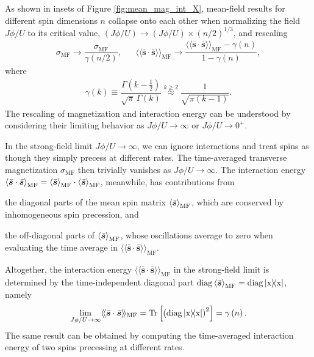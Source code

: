 \documentclass[nofootinbib,twocolumn]{revtex4-2}
\newcommand{\f}[2]{\dfrac{#1}{#2}} %
\newcommand{\p}[1]{\left(#1\right)} %
\renewcommand{\sp}[1]{\left[#1\right]} %
\newcommand{\bk}{\Braket} %
\renewcommand{\v}{\bm} %
\renewcommand{\c}{\cdot} %
\newcommand{\bbk}[1]{\langle\!\langle #1 \rangle\!\rangle}
\newcommand{\1}{\mathds{1}}
\newcommand{\x}{\text{x}}
\newcommand{\MF}{\text{MF}}
\renewcommand{\ss}{\bar{\v s}\c\bar{\v s}}
\DeclareMathOperator{\diag}{diag}
\begin{document}
As shown in insets of Figure \ref{fig:mean_mag_int_X}, mean-field results for different spin dimensions $n$ collapse onto each other when normalizing the field $J\phi/U$ to its critical value, $\p{J\phi/U}\to\p{J\phi/U}\times\p{n/2}^{1/3}$, and rescaling
\begin{align}
  \sigma_\MF \to \f{\sigma_\MF}{\gamma\p{n/2}},
  &&
  \bbk{\ss}_\MF \to \f{\bbk{\ss}_\MF-\gamma\p{n}}{1-\gamma\p{n}},
  \label{eq:rescale}
\end{align}
where
\begin{align}
  \gamma\p{k} \equiv \f{\Gamma\p{k-\frac12}}{\sqrt\pi\,\Gamma\p{k}}
  \stackrel{k\ge2}{\approx} \f1{\sqrt{\pi(k-1)}}.
  \label{eq:gamma}
\end{align}
The rescaling of magnetization and interaction energy can be understood by considering their limiting behavior as $J\phi/U\to\infty$ or $J\phi/U\to0^+$.

In the strong-field limit $J\phi/U\to\infty$, we can ignore interactions and treat spins as though they simply precess at different rates.
The time-averaged transverse magnetization $\sigma_\MF$ then trivially vanishes as $J\phi/U\to\infty$.
The interaction energy $\bk{\ss}_\MF = \bk{\bar{\v s}}_\MF \c \bk{\bar{\v s}}_\MF$, meanwhile, has contributions from
\begin{enumerate*}
\item the diagonal parts of the mean spin matrix $\bk{\bar{\v s}}_\MF$, which are conserved by inhomogeneous spin precession, and
\item the off-diagonal parts of $\bk{\bar{\v s}}_\MF$, whose oscillations average to zero when evaluating the time average in $\bbk{\ss}_\MF$.
\end{enumerate*}
Altogether, the interaction energy $\bbk{\ss}_\MF$ in the strong-field limit is determined by the time-independent diagonal part $\diag\bk{\bar{\v s}}_\MF = \diag\op{\x}$, namely
\begin{align}
  \lim_{J\phi/U\to\infty} \bbk{\ss}_\MF
  = \Tr\sp{\p{\diag\op{\x}}^2}
  = \gamma\p{n}.
  \label{eq:lim_ss}
\end{align}
The same result can be obtained by computing the time-averaged interaction energy of two spins precessing at different rates.
\end{document}
